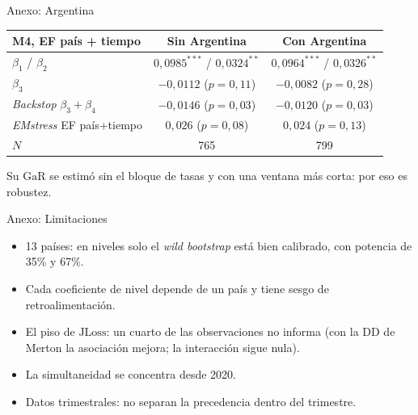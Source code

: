 \documentclass[aspectratio=169]{beamer}
\newcommand{\JLoss}{\mathrm{JLoss}}
\newcommand{\GaR}{\mathrm{GaR}}
\begin{document}
\begin{frame}{Anexo: Argentina}
\centering
\small
\begin{tabular}{lcc}
\toprule
M4, EF país + tiempo & Sin Argentina & Con Argentina \\
\midrule
$\beta_1$ / $\beta_2$ & $0{,}0985^{***}$ / $0{,}0324^{**}$ & $0{,}0964^{***}$ / $0{,}0326^{**}$ \\
$\beta_3$ & $-0{,}0112$ ($p=0{,}11$) & $-0{,}0082$ ($p=0{,}28$) \\
\textit{Backstop} $\beta_3+\beta_4$ & $-0{,}0146$ ($p=0{,}03$) & $-0{,}0120$ ($p=0{,}03$) \\
\textit{EMstress} EF país+tiempo & $0{,}026$ ($p=0{,}08$) & $0{,}024$ ($p=0{,}13$) \\
$N$ & 765 & 799 \\
\bottomrule
\end{tabular}
\vspace{6pt}

\footnotesize Su $\GaR$ se estimó sin el bloque de tasas y con una ventana más corta: por eso es robustez.
\end{frame}

\begin{frame}{Anexo: Limitaciones}
\begin{itemize}\small\setlength\itemsep{4pt}
\item 13 países: en niveles solo el \textit{wild bootstrap} está bien calibrado, con potencia de 35\% y 67\%.
\item Cada coeficiente de nivel depende de un país y tiene sesgo de retroalimentación.
\item El piso de $\JLoss$: un cuarto de las observaciones no informa (con la DD de Merton la asociación mejora; la interacción sigue nula).
\item La simultaneidad se concentra desde 2020.
\item Datos trimestrales: no separan la precedencia dentro del trimestre.
\end{itemize}
\end{frame}
\end{document}
